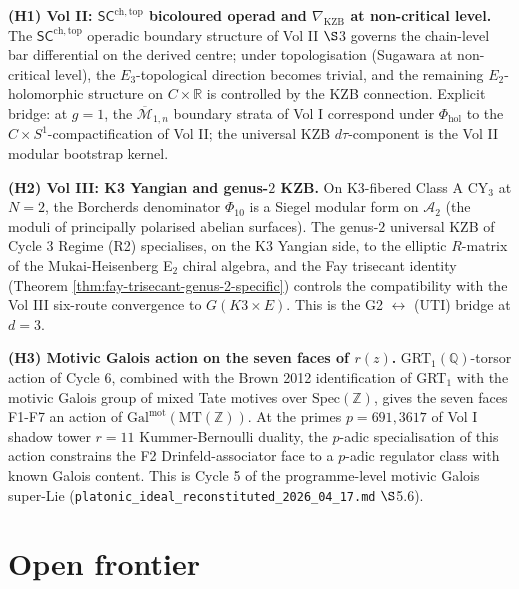 \documentclass[12pt]{article}
\providecommand{\KZB}{\mathrm{KZB}}
\providecommand{\Mbar}{\overline{\mathcal{M}}}
\theoremstyle{definition}
\begin{document}
\textbf{(H1) Vol II: $\mathsf{SC}^{\mathrm{ch,top}}$ bicoloured operad
and $\nabla_{\KZB}$ at non-critical level.}
The $\mathsf{SC}^{\mathrm{ch,top}}$ operadic boundary structure
of Vol II $\S$3 governs the chain-level bar differential on
the derived centre; under topologisation (Sugawara at
non-critical level), the $E_3$-topological direction becomes
trivial, and the remaining $E_2$-holomorphic structure on
$C \times \mathbb{R}$ is controlled by the KZB connection.
Explicit bridge: at $g = 1$, the $\Mbar_{1,n}$ boundary strata
of Vol I correspond under $\Phi_{\mathrm{hol}}$ to the
$C \times S^1$-compactification of Vol II; the universal KZB
$d\tau$-component is the Vol II modular bootstrap kernel.

\textbf{(H2) Vol III: K3 Yangian and genus-$2$ KZB.}
On K3-fibered Class A CY$_3$ at $N = 2$, the Borcherds
denominator $\Phi_{10}$ is a Siegel modular form on
$\mathcal{A}_2$ (the moduli of principally polarised abelian
surfaces).  The genus-$2$ universal KZB of Cycle 3 Regime
(R2) specialises, on the K3 Yangian side, to the elliptic
$R$-matrix of the Mukai-Heisenberg E\hspace{0pt}${}_2$ chiral
algebra, and the Fay trisecant identity
(Theorem \ref{thm:fay-trisecant-genus-2-specific}) controls
the compatibility with the Vol III six-route convergence
to $G(K3 \times E)$.
This is the G2 $\leftrightarrow$ (UTI) bridge at $d = 3$.

\textbf{(H3) Motivic Galois action on the seven faces of
$r(z)$.}
GRT$_1(\mathbb{Q})$-torsor action of Cycle 6, combined with
the Brown 2012 identification of GRT$_1$ with the motivic
Galois group of mixed Tate motives over $\mathrm{Spec}(\mathbb{Z})$,
gives the seven faces F1-F7 an action of
$\mathrm{Gal}^{\mathrm{mot}}(\mathrm{MT}(\mathbb{Z}))$.
At the primes $p = 691, 3617$ of Vol I shadow tower
$r = 11$ Kummer-Bernoulli duality, the $p$-adic specialisation
of this action constrains the F2 Drinfeld-associator face
to a $p$-adic regulator class with known Galois content.
This is Cycle 5 of the programme-level motivic Galois
super-Lie (\texttt{platonic\_ideal\_reconstituted\_2026\_04\_17.md}
$\S$5.6).

\section{Open frontier}
\label{sec:G2-opens}
\end{document}
